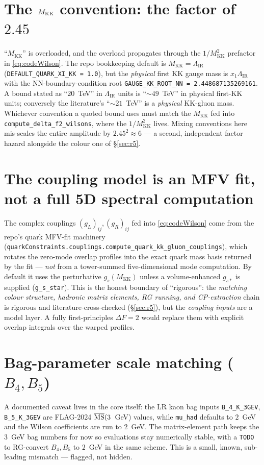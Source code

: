\documentclass[11pt]{article}
\newcommand{\MKK}{M_{\mathrm{KK}}}
\newcommand{\LIR}{\Lambda_{\mathrm{IR}}}
\newcommand{\gss}{g_{s*}}
\newcommand{\code}[1]{\texttt{#1}}
\theoremstyle{definition}
\begin{document}
\section{The $M_{\rm KK}$ convention: the factor of $2.45$}
\label{sec:mkkconv}

``$\MKK$'' is overloaded, and the overload propagates through the $1/\MKK^2$
prefactor in \eqref{eq:codeWilson}. The repo bookkeeping default is $\MKK=\LIR$
(\code{DEFAULT\_QUARK\_XI\_KK = 1.0}), but the \emph{physical} first KK gauge mass
is $x_1\LIR$ with the NN-boundary-condition root
\code{GAUGE\_KK\_ROOT\_NN = 2.448687135269161}. A bound stated as ``$20$~TeV'' in
$\LIR$ units is ``$\sim49$~TeV'' in physical first-KK units; conversely the
literature's ``$\sim21$~TeV'' is a \emph{physical} KK-gluon mass. Whichever
convention a quoted bound uses must match the $\MKK$ fed into
\code{compute\_delta\_f2\_wilsons}, where the $1/\MKK^2$ lives. Mixing conventions
here mis-scales the entire amplitude by $2.45^2\approx6$ --- a second, independent
factor hazard alongside the colour one of \S\ref{sec:r5}.

\section{The coupling model is an MFV fit, not a full 5D spectral computation}
\label{sec:couplingmodel}

The complex couplings $(g_L)_{ij},(g_R)_{ij}$ fed into \eqref{eq:codeWilson} come
from the repo's quark MFV-fit machinery
(\code{quarkConstraints.couplings.compute\_quark\_kk\_gluon\_couplings}), which
rotates the zero-mode overlap profiles into the exact quark mass basis returned by
the fit --- \emph{not} from a tower-summed five-dimensional mode computation. By
default it uses the perturbative $g_s(\MKK)$ unless a volume-enhanced $\gss$ is
supplied (\code{g\_s\_star}). This is the honest boundary of ``rigorous'': the
\emph{matching colour structure, hadronic matrix elements, RG running, and
CP-extraction} chain is rigorous and literature-cross-checked (\S\ref{sec:r5}),
but the \emph{coupling inputs} are a model layer. A fully first-principles
$\Delta F=2$ would replace them with explicit overlap integrals over the warped
profiles.

\section{Bag-parameter scale matching ($B_4,B_5$)}
\label{sec:bagscale}

A documented caveat lives in the core itself: the LR kaon bag inputs
\code{B\_4\_K\_3GEV}, \code{B\_5\_K\_3GEV} are FLAG-2024 $\overline{\rm MS}(3$~GeV)
values, while \code{mu\_had} defaults to $2$~GeV and the Wilson coefficients are
run to $2$~GeV. The matrix-element path keeps the $3$~GeV bag numbers for now so
evaluations stay numerically stable, with a \code{TODO} to RG-convert
$B_4,B_5$ to $2$~GeV in the same scheme. This is a small, known, sub-leading
mismatch --- flagged, not hidden.
\end{document}
